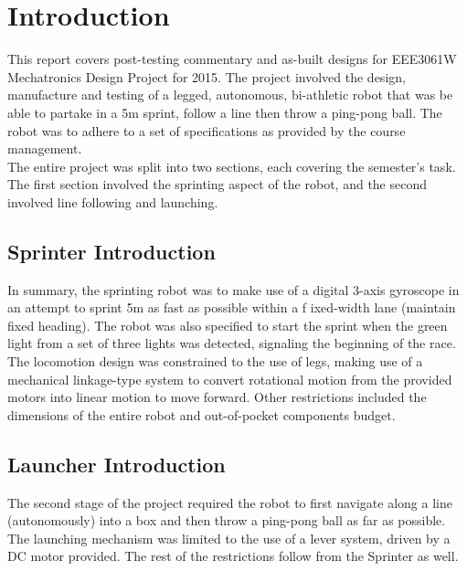 
\mainmatter
\clearpage
\section{Introduction}
\label{sec:Introduction}
  This report covers post-testing commentary and as-built designs for EEE3061W Mechatronics Design Project for 2015.  The project involved the design, manufacture and testing of a legged, autonomous, bi-athletic robot that was be able to partake in a 5m sprint, follow a line then throw a ping-pong ball.  The robot was to adhere to a set of specifications as provided by the course management. \\

  The entire project was split into two sections, each covering the semester's task.  The first section involved the sprinting aspect of the robot, and the second involved line following and launching.

  \subsection{Sprinter Introduction}
  \label{sub:Sprinter Introduction}
    In summary, the sprinting robot was to make use of a digital 3-axis gyroscope in an attempt to sprint 5m as fast as possible within a f ixed-width lane (maintain fixed heading).  The robot was also specified to start the sprint when the green light from a set of three lights was detected, signaling the beginning of the race. \\

    The locomotion design was constrained to the use of legs, making use of a mechanical linkage-type system to convert rotational motion from the provided motors into linear motion to move forward.  Other restrictions included the dimensions of the entire robot and out-of-pocket components budget.

  \subsection{Launcher Introduction}
  \label{sub:Launcher Introduction}
    The second stage of the project required the robot to first navigate along a line (autonomously) into a box and then throw a ping-pong ball as far as possible. The launching mechanism was limited to the use of a lever system, driven by a DC motor provided.  The rest of the restrictions follow from the Sprinter as well. \\

